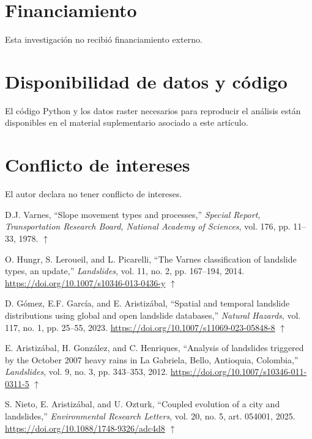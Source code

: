 \documentclass[letterpaper,11pt]{tec}
\begin{document}
{\section*{Financiamiento}
Esta investigación no recibió financiamiento externo.

\section*{Disponibilidad de datos y código}
El código Python y los datos raster necesarios para reproducir el análisis están disponibles en el material suplementario asociado
a este artículo.

\section*{Conflicto de intereses}
El autor declara no tener conflicto de intereses.


\hypersetup{urlcolor=blue2}
\renewcommand{\refname}{Referencias}
\renewcommand{\baselinestretch}{1.2}
\small
\begin{thebibliography}{}

 D.J. Varnes, ``Slope movement types and processes,'' {\it Special Report, Transportation Research Board, National Academy of Sciences}, vol. 176, pp. 11--33, 1978.
$\uparrow$\par

 O. Hungr, S. Leroueil, and L. Picarelli, ``The Varnes classification of landslide types, an update,'' {\it Landslides}, vol. 11, no. 2, pp. 167--194, 2014.
\url{https://doi.org/10.1007/s10346-013-0436-y}
$\uparrow$\par

 D. Gómez, E.F. García, and E. Aristizábal, ``Spatial and temporal landslide distributions using global and open landslide databases,'' {\it Natural Hazards}, vol. 117, no. 1, pp. 25--55, 2023.
\url{https://doi.org/10.1007/s11069-023-05848-8}
$\uparrow$\par

 E. Aristizábal, H. González, and C. Henriques, ``Analysis of landslides triggered by the October 2007 heavy rains in La Gabriela, Bello, Antioquia, Colombia,'' {\it Landslides}, vol. 9, no. 3, pp. 343--353, 2012.
\url{https://doi.org/10.1007/s10346-011-0311-5}
$\uparrow$\par

 S. Nieto, E. Aristizábal, and U. Ozturk, ``Coupled evolution of a city and landslides,'' {\it Environmental Research Letters}, vol. 20, no. 5, art. 054001, 2025.
\url{https://doi.org/10.1088/1748-9326/adc4d8}
$\uparrow$\par


\end{thebibliography}}
\end{document}
